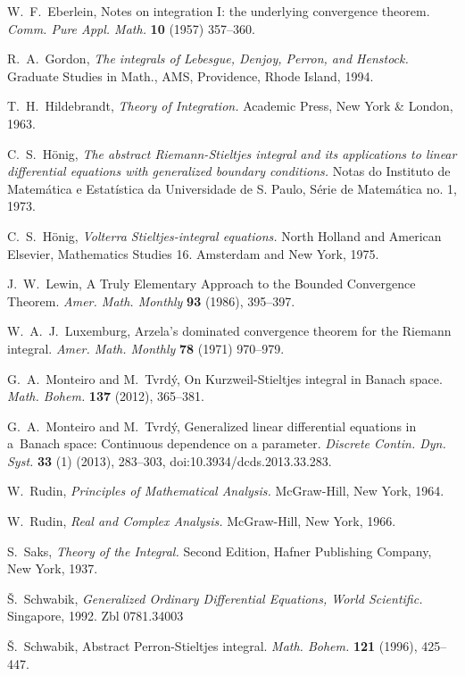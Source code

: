 \documentclass[12pt,twoside]{article}
\numberwithin{equation}{section}
\theoremstyle{plain}
\theoremstyle{definition}
\begin{document}
{\begin{thebibliography}{99}
W.~F.~Eberlein,
Notes on integration I: the underlying convergence theorem.
{\sl Comm. Pure Appl. Math.} {\bf 10} (1957) 357--360.

R.~A.~Gordon,
{\sl The integrals of Lebesgue, Denjoy, Perron, and Henstock.}
Graduate Studies in Math., AMS, Providence, Rhode Island, 1994.

T.~H.~Hildebrandt,
{\sl Theory of Integration.} Academic Press, New York \& London, 1963.

C.~S.~H\"onig,
{\sl The abstract Riemann-Stieltjes integral and its applications to linear
differential equations with generalized boundary conditions.}
Notas do Instituto de Matem\'atica e Estat\'istica da Universidade de S. Paulo,
S\'erie de Matem\'atica no. 1, 1973.

C.~S.~H\"onig,
{\sl Volterra Stieltjes-integral equations.}
North Holland and American Elsevier, Mathematics Studies 16. Amsterdam and New York, 1975.

J.~W.~Lewin,
A Truly Elementary Approach to the Bounded Convergence Theorem.
{\sl  Amer. Math. Monthly} {\bf 93} (1986), 395--397.

W.~A.~J.~Luxemburg,
Arzela's dominated convergence theorem for the Riemann integral.
{\sl  Amer. Math. Monthly} {\bf 78} (1971) 970--979.

G.~A.~Monteiro and M.~Tvrd\'y,
On Kurzweil-Stieltjes integral in Banach space.
{\sl Math. Bohem.} {\bf 137} (2012), 365--381.

G.~A.~Monteiro and M.~Tvrd\'y,
Generalized linear differential equations in a~Banach space: Continuous dependence
on a parameter.
{\sl Discrete Contin. Dyn. Syst.} {\bf 33} (1) (2013), 283--303,
doi:10.3934/dcds.2013.33.283.

W.~Rudin,
{\sl Principles of Mathematical Analysis.}
McGraw-Hill, New York, 1964.

W.~Rudin,
{\sl Real and Complex Analysis.}
McGraw-Hill, New York, 1966.

S.~Saks,
{\sl Theory of the Integral.}
Second Edition, Hafner Publishing Company, New York, 1937.

\v{S}.~Schwabik,
{\sl Generalized Ordinary Differential Equations, World Scientific.}
Singapore, 1992. Zbl 0781.34003

\v{S}.~Schwabik,
Abstract Perron-Stieltjes integral. {\sl Math. Bohem.} {\bf 121} (1996), 425--447.


\end{thebibliography}}
\end{document}
